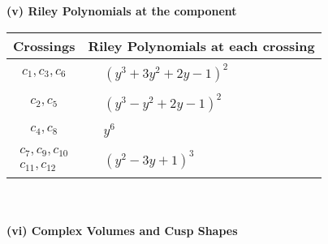 \documentclass[1p]{elsarticle_modified}
\theoremstyle{definition}
\begin{document}
\newpage\renewcommand{\arraystretch}{1}
\flushleft \textbf{(v) Riley Polynomials at the component}\newline \\
\begin{tabular}{m{50pt}|m{274pt}}
Crossings & \hspace{64pt}Riley Polynomials at each crossing \\
\hline $$\begin{aligned}c_{1},c_{3},c_{6}\end{aligned}$$&$\begin{aligned}
&(y^3+3 y^2+2 y-1)^2
\end{aligned}$\\
\hline $$\begin{aligned}c_{2},c_{5}\end{aligned}$$&$\begin{aligned}
&(y^3- y^2+2 y-1)^2
\end{aligned}$\\
\hline $$\begin{aligned}c_{4},c_{8}\end{aligned}$$&$\begin{aligned}
&y^6
\end{aligned}$\\
\hline $$\begin{aligned}c_{7},c_{9},c_{10}\\c_{11},c_{12}\end{aligned}$$&$\begin{aligned}
&(y^2-3 y+1)^3
\end{aligned}$\\
\hline
\end{tabular}\\~\\
\newpage\flushleft \textbf{(vi) Complex Volumes and Cusp Shapes}
\end{document}
